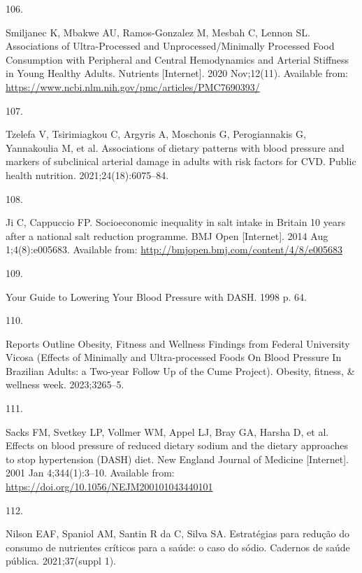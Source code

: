 \documentclass[
]{article}
\newlength{\cslhangindent}
\newlength{\csllabelwidth}
\newlength{\cslentryspacingunit} %
\newenvironment{CSLReferences}[2] %
 {%
  \setlength{\parindent}{0pt}
  \ifodd #1
  \let\oldpar\par
  \def\par{\hangindent=\cslhangindent\oldpar}
  \fi
  \setlength{\parskip}{#2\cslentryspacingunit}
 }%
 {}
\newcommand{\CSLLeftMargin}[1]{\parbox[t]{\csllabelwidth}{#1}}
\newcommand{\CSLRightInline}[1]{\parbox[t]{\linewidth - \csllabelwidth}{#1}\break}
\begin{document}
\begin{CSLReferences}{0}{0}
\leavevmode{}%
\CSLLeftMargin{106. }%
\CSLRightInline{Smiljanec K, Mbakwe AU, Ramos-Gonzalez M, Mesbah C,
Lennon SL. Associations of Ultra-Processed and Unprocessed/Minimally
Processed Food Consumption with Peripheral and Central Hemodynamics and
Arterial Stiffness in Young Healthy Adults. Nutrients {[}Internet{]}.
2020 Nov;12(11). Available from:
\url{https://www.ncbi.nlm.nih.gov/pmc/articles/PMC7690393/}}

\leavevmode{}%
\CSLLeftMargin{107. }%
\CSLRightInline{Tzelefa V, Tsirimiagkou C, Argyris A, Moschonis G,
Perogiannakis G, Yannakoulia M, et al. Associations of dietary patterns
with blood pressure and markers of subclinical arterial damage in adults
with risk factors for {CVD}. Public health nutrition.
2021;24(18):6075--84. }

\leavevmode{}%
\CSLLeftMargin{108. }%
\CSLRightInline{Ji C, Cappuccio FP. Socioeconomic inequality in salt
intake in Britain 10 years after a national salt reduction programme.
BMJ Open {[}Internet{]}. 2014 Aug 1;4(8):e005683. Available from:
\url{http://bmjopen.bmj.com/content/4/8/e005683}}

\leavevmode{}%
\CSLLeftMargin{109. }%
\CSLRightInline{Your Guide to Lowering Your Blood Pressure with DASH.
1998 p. 64. }

\leavevmode{}%
\CSLLeftMargin{110. }%
\CSLRightInline{Reports Outline Obesity, Fitness and Wellness Findings
from Federal University Vicosa (Effects of Minimally and Ultra-processed
Foods On Blood Pressure In Brazilian Adults: a Two-year Follow Up of the
Cume Project). Obesity, fitness, \& wellness week. 2023;3265--5. }

\leavevmode{}%
\CSLLeftMargin{111. }%
\CSLRightInline{Sacks FM, Svetkey LP, Vollmer WM, Appel LJ, Bray GA,
Harsha D, et al. Effects on blood pressure of reduced dietary sodium and
the dietary approaches to stop hypertension (DASH) diet. New England
Journal of Medicine {[}Internet{]}. 2001 Jan 4;344(1):3--10. Available
from: \url{https://doi.org/10.1056/NEJM200101043440101}}

\leavevmode{}%
\CSLLeftMargin{112. }%
\CSLRightInline{Nilson EAF, Spaniol AM, Santin R da C, Silva SA.
Estratégias para redução do consumo de nutrientes críticos para a saúde:
o caso do sódio. Cadernos de saúde pública. 2021;37(suppl 1). }


\end{CSLReferences}
\end{document}

